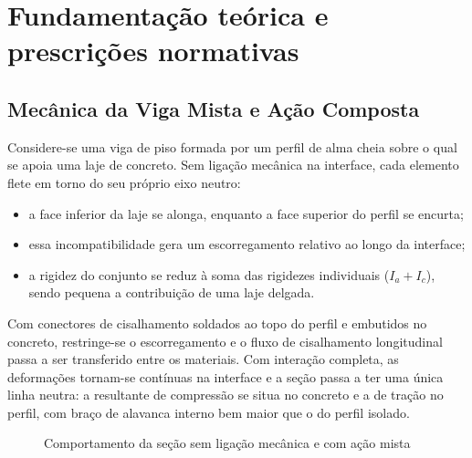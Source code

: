 \chapter{Fundamentação teórica e prescrições normativas}\label{cap:2}

\section{Mecânica da Viga Mista e Ação Composta}\label{sec:2.1}
Considere-se uma viga de piso formada por um perfil de alma cheia sobre o qual se apoia uma laje de concreto. Sem ligação mecânica na interface, cada elemento flete em torno do seu próprio eixo neutro:
\begin{itemize}
\item a face inferior da laje se alonga, enquanto a face superior do perfil se encurta;
\item essa incompatibilidade gera um escorregamento relativo ao longo da interface;
\item a rigidez do conjunto se reduz à soma das rigidezes individuais ($I_a + I_c$), sendo pequena a contribuição de uma laje delgada.
\end{itemize}

Com conectores de cisalhamento soldados ao topo do perfil e embutidos no concreto, restringe-se o escorregamento e o fluxo de cisalhamento longitudinal passa a ser transferido entre os materiais. Com interação completa, as deformações tornam-se contínuas na interface e a seção passa a ter uma única linha neutra: a resultante de compressão se situa no concreto e a de tração no perfil, com braço de alavanca interno bem maior que o do perfil isolado.

\begin{figure}[htbp]
  \centering
  \caption{Comportamento da seção sem ligação mecânica e com ação mista}\label{fig:acao-mista}
\end{figure}

